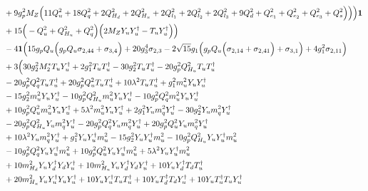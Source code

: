 \begin{align}
 &+9 g_{p}^{2} M_Z \Big(11 Q_{u}^{2}  + 18 Q_{q}^{2}  + 2 Q_{H_d}^{2}  + 2 Q_{H_u}^{2}  + 2 Q_{l_1}^{2}  + 2 Q_{l_2}^{2}  + 2 Q_{l_3}^{2}  + 9 Q_{d}^{2}  + Q_{e_{1}}^{2} + Q_{e_{2}}^{2} + Q_{e_3}^{2} + Q_{s}^{2}\Big)\Big)\Big){\bf 1} \nonumber \\ 
 &+15 \Big(- Q_{u}^{2}  + Q_{H_u}^{2} + Q_{q}^{2}\Big)\Big(2 M_Z {Y_u  Y_{u}^{\dagger}}  - {T_u  Y_{u}^{\dagger}} \Big)\Big)\nonumber \\ 
 &-4 {\bf 1} \Big(15 g_p Q_{u} \Big(g_p Q_{u} \sigma_{2,44}  + \sigma_{3,4}\Big) + 20 g_{3}^{4} \sigma_{2,3}  -2 \sqrt{15} g_1 \Big(g_p Q_{u} \Big(\sigma_{2,14} + \sigma_{2,41}\Big) + \sigma_{3,1}\Big) + 4 g_{1}^{2} \sigma_{2,11} \Big)\nonumber \\ 
 &+3 \Big(30 g_{2}^{2} M_2^* {T_u  Y_{u}^{\dagger}} +2 g_{1}^{2} {T_u  T_{u}^{\dagger}} -30 g_{2}^{2} {T_u  T_{u}^{\dagger}} -20 g_{p}^{2} Q_{H_u}^{2} {T_u  T_{u}^{\dagger}} \nonumber \\ 
 &-20 g_{p}^{2} Q_{q}^{2} {T_u  T_{u}^{\dagger}} +20 g_{p}^{2} Q_{u}^{2} {T_u  T_{u}^{\dagger}} +10 \lambda^{2} {T_u  T_{u}^{\dagger}} +g_{1}^{2} {m_u^2  Y_u  Y_{u}^{\dagger}} \nonumber \\ 
 &-15 g_{2}^{2} {m_u^2  Y_u  Y_{u}^{\dagger}} -10 g_{p}^{2} Q_{H_u}^{2} {m_u^2  Y_u  Y_{u}^{\dagger}} -10 g_{p}^{2} Q_{q}^{2} {m_u^2  Y_u  Y_{u}^{\dagger}} \nonumber \\ 
 &+10 g_{p}^{2} Q_{u}^{2} {m_u^2  Y_u  Y_{u}^{\dagger}} +5 \lambda^{2} {m_u^2  Y_u  Y_{u}^{\dagger}} +2 g_{1}^{2} {Y_u  m_q^2  Y_{u}^{\dagger}} -30 g_{2}^{2} {Y_u  m_q^2  Y_{u}^{\dagger}} \nonumber \\ 
 &-20 g_{p}^{2} Q_{H_u}^{2} {Y_u  m_q^2  Y_{u}^{\dagger}} -20 g_{p}^{2} Q_{q}^{2} {Y_u  m_q^2  Y_{u}^{\dagger}} +20 g_{p}^{2} Q_{u}^{2} {Y_u  m_q^2  Y_{u}^{\dagger}} \nonumber \\ 
 &+10 \lambda^{2} {Y_u  m_q^2  Y_{u}^{\dagger}} +g_{1}^{2} {Y_u  Y_{u}^{\dagger}  m_u^2} -15 g_{2}^{2} {Y_u  Y_{u}^{\dagger}  m_u^2} -10 g_{p}^{2} Q_{H_u}^{2} {Y_u  Y_{u}^{\dagger}  m_u^2} \nonumber \\ 
 &-10 g_{p}^{2} Q_{q}^{2} {Y_u  Y_{u}^{\dagger}  m_u^2} +10 g_{p}^{2} Q_{u}^{2} {Y_u  Y_{u}^{\dagger}  m_u^2} +5 \lambda^{2} {Y_u  Y_{u}^{\dagger}  m_u^2} \nonumber \\ 
 &+10 m_{H_d}^2 {Y_u  Y_{d}^{\dagger}  Y_d  Y_{u}^{\dagger}} +10 m_{H_u}^2 {Y_u  Y_{d}^{\dagger}  Y_d  Y_{u}^{\dagger}} +10 {Y_u  Y_{d}^{\dagger}  T_d  T_{u}^{\dagger}} \nonumber \\ 
 &+20 m_{H_u}^2 {Y_u  Y_{u}^{\dagger}  Y_u  Y_{u}^{\dagger}} +10 {Y_u  Y_{u}^{\dagger}  T_u  T_{u}^{\dagger}} +10 {Y_u  T_{d}^{\dagger}  T_d  Y_{u}^{\dagger}} +10 {Y_u  T_{u}^{\dagger}  T_u  Y_{u}^{\dagger}} \nonumber 
\end{align} 
